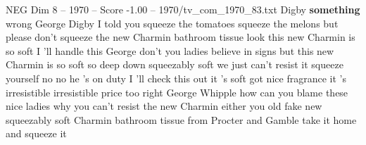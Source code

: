 \begin{textsample}{NEG Dim 8 – 1970 – Score -1.00 – 1970/tv\_com\_1970\_83.txt}  \label{ex:f8_neg_014}
Digby \textbf{something} wrong George Digby I told you squeeze the tomatoes squeeze the melons but please don't squeeze the new Charmin bathroom tissue look this new Charmin is so soft I 'll handle this George don't you ladies believe in signs but this new Charmin is so soft so deep down squeezably soft we just can't resist it squeeze yourself no no he 's on duty I 'll check this out it 's soft got nice fragrance it 's irresistible irresistible price too right George Whipple how can you blame these nice ladies why you can't resist the new Charmin either you old fake new squeezably soft Charmin bathroom tissue from Procter and Gamble take it home and squeeze it

\end{textsample}
